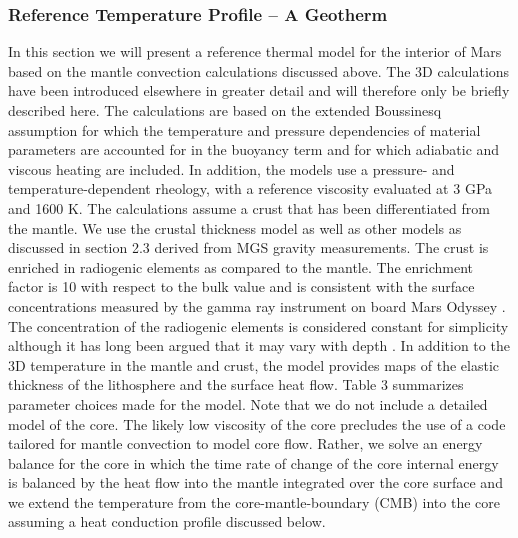 \subsubsection{Reference Temperature Profile -- A Geotherm }
\label{ref_temp}
In this section we will present a reference thermal model for the interior of Mars based on the mantle convection calculations discussed above. The 3D calculations have been introduced elsewhere in greater detail \citep[e.g.,][]{Plesa2016} and will therefore only be briefly described here. The calculations are based on the extended Boussinesq assumption \citep[e.g.,][]{Schubert2001} for which the temperature and pressure dependencies of material parameters are accounted for in the buoyancy term and for which adiabatic and viscous heating are included. In addition, the models use a pressure- and temperature-dependent rheology, with a reference viscosity evaluated at 3 GPa and 1600 K. The calculations assume a crust that has been differentiated from the mantle. We use the \citet{Neumann2004} crustal thickness model as well as other models as discussed in section 2.3 derived from MGS gravity measurements. The crust is enriched in radiogenic elements as compared to the mantle. The enrichment factor is 10 with respect to the bulk value and is consistent with the surface concentrations measured by the gamma ray instrument on board Mars Odyssey \citep{Taylor2007, Hahn2011}. The concentration of the radiogenic elements is considered constant for simplicity although it has long been argued that it may vary with depth \citep[e.g.,][]{Newsom2007}. In addition to the 3D temperature in the mantle and crust, the model provides maps of the elastic thickness of the lithosphere and the surface heat flow. Table 3 summarizes parameter choices made for the model. Note that we do not include a detailed model of the core. The likely low viscosity of the core precludes the use of a code tailored for mantle convection to model core flow. Rather, we solve an energy balance for the core in which the time rate of change of the core internal energy is balanced by the heat flow into the mantle integrated over the core surface and we extend the temperature from the core-mantle-boundary (CMB) into the core assuming a heat conduction profile discussed below. 
%

